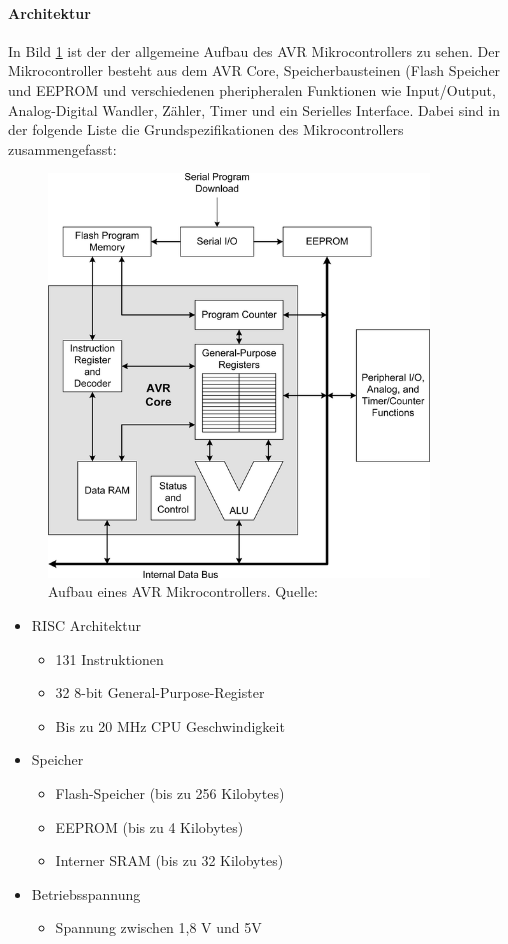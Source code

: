 \paragraph{Architektur}
In Bild \ref{img:aufbauMikrocontroller} ist der der allgemeine Aufbau des AVR Mikrocontrollers zu sehen. Der Mikrocontroller besteht aus dem AVR Core, Speicherbausteinen (Flash Speicher und EEPROM und verschiedenen  pheripheralen Funktionen wie Input/Output, Analog-Digital Wandler, Zähler, Timer und ein Serielles Interface. Dabei sind in der folgende Liste die Grundspezifikationen des Mikrocontrollers zusammengefasst:
\begin{figure}
	\centering
	\includegraphics[width=0.9\textwidth]{bilder/aufbauMikrocontroller.png}
	\caption{Aufbau eines AVR Mikrocontrollers. Quelle: }
	\label{img:aufbauMikrocontroller}
\end{figure}
\begin{itemize}
	\item RISC Architektur
	\begin{itemize}
		\item 131 Instruktionen
		\item 32 8-bit General-Purpose-Register
		\item Bis zu 20 MHz CPU Geschwindigkeit
	\end{itemize}
	\item Speicher
	\begin{itemize}
		\item Flash-Speicher (bis zu 256 Kilobytes)
		\item EEPROM (bis zu 4 Kilobytes)
		\item Interner SRAM (bis zu 32 Kilobytes)
	\end{itemize}
	\item Betriebsspannung
	\begin{itemize}
		\item Spannung zwischen 1,8 V und 5V
	\end{itemize}
\end{itemize}
